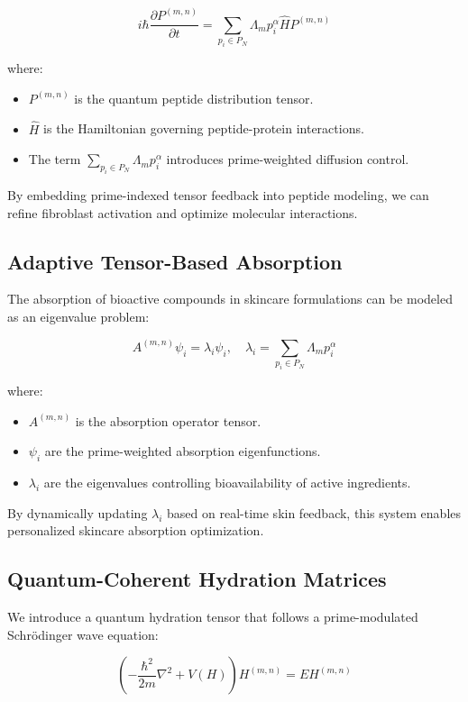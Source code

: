 \documentclass{article}
\theoremstyle{plain}
\theoremstyle{claimstyle}
\begin{document}
\begin{equation}
i \hbar \frac{\partial P^{(m,n)}}{\partial t} = \sum_{p_i \in P_N} \Lambda_m p_i^{\alpha} \hat{H} P^{(m,n)}
\end{equation}

where:
\begin{itemize}
    \item $P^{(m,n)}$ is the quantum peptide distribution tensor.
    \item $\hat{H}$ is the Hamiltonian governing peptide-protein interactions.
    \item The term $\sum_{p_i \in P_N} \Lambda_m p_i^{\alpha}$ introduces prime-weighted diffusion control.
\end{itemize}

By embedding prime-indexed tensor feedback into peptide modeling, we can refine fibroblast activation and optimize molecular interactions.

\subsection{Adaptive Tensor-Based Absorption}
The absorption of bioactive compounds in skincare formulations can be modeled as an eigenvalue problem:

\begin{equation}
A^{(m,n)} \psi_i = \lambda_i \psi_i, \quad \lambda_i = \sum_{p_i \in P_N} \Lambda_m p_i^{\alpha}
\end{equation}

where:
\begin{itemize}
    \item $A^{(m,n)}$ is the absorption operator tensor.
    \item $\psi_i$ are the prime-weighted absorption eigenfunctions.
    \item $\lambda_i$ are the eigenvalues controlling bioavailability of active ingredients.
\end{itemize}

By dynamically updating $\lambda_i$ based on real-time skin feedback, this system enables personalized skincare absorption optimization.

\subsection{Quantum-Coherent Hydration Matrices}
We introduce a quantum hydration tensor that follows a prime-modulated Schrödinger wave equation:

\begin{equation}
\left( -\frac{\hbar^2}{2m} \nabla^2 + V(H) \right) H^{(m,n)} = E H^{(m,n)}
\end{equation}
\end{document}
